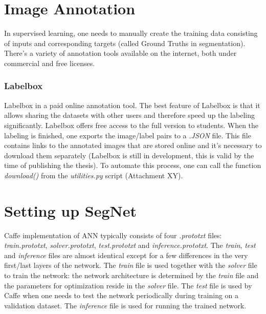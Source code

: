 \section{Image Annotation}

In supervised learning, one needs to manually create the training data consisting of inputs and corresponding targets (called Ground Truths in segmentation). There's a variety of annotation tools available on the internet, both under commercial and free licenses. 

\subsubsection{Labelbox}

Labelbox in a paid online annotation tool. The best feature of Labelbox is that it allows sharing the datasets with other users and therefore speed up the labeling significantly. Labelbox offers free access to the full version to students. When the labeling is finished, one exports the image/label pairs to a \textit{.JSON} file. This file contains links to the annotated images that are stored online and it's necessary to download them separately (Labelbox is still in development, this is valid by the time of publishing the thesis). To automate this process, one can call the function \textit{download()} from the \textit{utilities.py} script (Attachment XY). 



\section{Setting up SegNet}

Caffe implementation of ANN typically consists of four \textit{.prototxt} files: \textit{train.prototxt}, \textit{solver.prototxt}, \textit{test.prototxt} and \textit{inference.prototxt}. The \textit{train}, \textit{test} and \textit{inference} files are almost identical except for a few differences in the very first/last layers of the network. The \textit{train} file is used together with the \textit{solver} file to train the network: the network architecture is determined by the \textit{train} file and the parameters for optimization reside in the \textit{solver} file. The \textit{test} file is used by Caffe when one needs to test the network periodically during training on a validation dataset. The \textit{inference} file is used for running the trained network.

